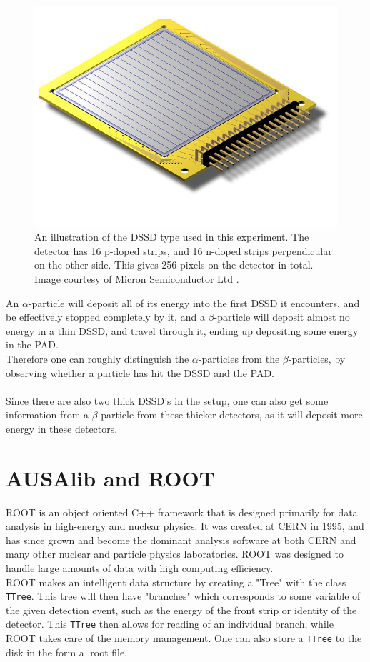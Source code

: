 \begin{figure}[h]
	\centering
	\includegraphics[width=\columnwidth]{../figures/W1.jpg}
	\caption{An illustration of the DSSD type used in this experiment. The detector has 16 p-doped strips, and 16 n-doped strips perpendicular on the other side. This gives 256 pixels on the detector in total. Image courtesy of Micron Semiconductor Ltd \cite{detector}.}
	\label{fig:W1}
\end{figure}

An $\alpha$-particle will deposit all of its energy into the first DSSD it encounters, and be effectively stopped completely by it, and a $\beta$-particle will deposit almost no energy in a thin DSSD, and travel through it, ending up depositing some energy in the PAD. \\
Therefore one can roughly distinguish the $\alpha$-particles from the $\beta$-particles, by observing whether a particle has hit the DSSD and the PAD. \\
\\
Since there are also two thick DSSD's in the setup, one can also get some information from a $\beta$-particle from these thicker detectors, as it will deposit more energy in these detectors. 




\section{AUSAlib and ROOT}
ROOT \cite{ROOT} is an object oriented C++ framework that is designed primarily for data analysis in high-energy and nuclear physics. It was created at CERN in 1995, and has since grown and become the dominant analysis software at both CERN and many other nuclear and particle physics laboratories. 
ROOT was designed to handle large amounts of data with high computing efficiency. \\
ROOT makes an intelligent data structure by creating a "Tree" with the class \texttt{TTree}. This tree will then have "branches" which corresponds to some variable of the given detection event, such as the energy of the front strip or identity of the detector. This \texttt{TTree} then allows for reading of an individual branch, while ROOT takes care of the memory management. One can also store a \texttt{TTree} to the disk in the form a .root file. \\

